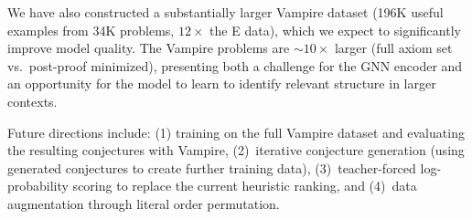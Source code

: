 \documentclass{easychair}
\newcommand{\Eprover}{E\xspace}
\newcommand{\Vampire}{Vampire\xspace}
\begin{document}
We have also constructed a substantially larger \Vampire dataset
(196K useful examples from 34K problems, $12\times$ the \Eprover
data), which we expect to significantly improve model quality. The
\Vampire problems are ${\sim}10\times$ larger (full axiom
set vs.\ post-proof minimized), presenting both a challenge for the GNN
encoder and an opportunity for the model to learn to identify relevant
structure in larger contexts.

Future directions include: (1) training on the full \Vampire dataset
and evaluating the resulting conjectures with \Vampire, (2)~iterative
conjecture generation (using generated conjectures to create further
training data), (3)~teacher-forced log-probability scoring to replace
the current heuristic ranking, and (4)~data augmentation through
literal order permutation.
\end{document}

